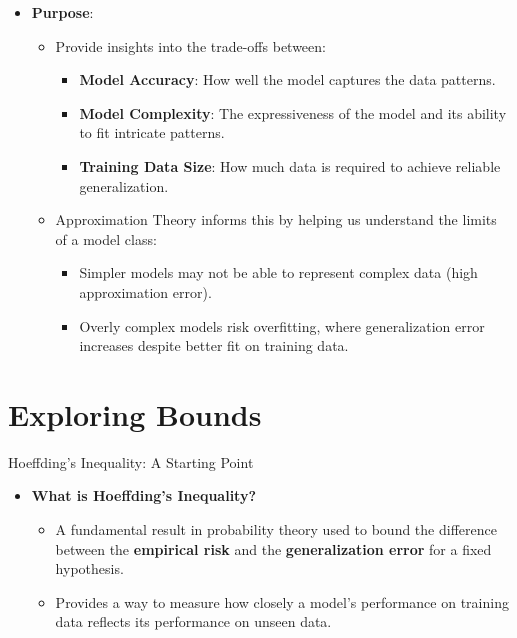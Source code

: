 \documentclass[
  ignorenonframetext,
]{beamer}
\providecommand{\tightlist}{%
  \setlength{\itemsep}{0pt}\setlength{\parskip}{0pt}}\usepackage{longtable,booktabs,array}
\begin{document}
\begin{frame}
\begin{itemize}
\tightlist
\item
  \textbf{Purpose}:

  \begin{itemize}
  \tightlist
  \item
    Provide insights into the trade-offs between:

    \begin{itemize}
    \tightlist
    \item
      \textbf{Model Accuracy}: How well the model captures the data
      patterns.
    \item
      \textbf{Model Complexity}: The expressiveness of the model and its
      ability to fit intricate patterns.
    \item
      \textbf{Training Data Size}: How much data is required to achieve
      reliable generalization.
    \end{itemize}
  \item
    Approximation Theory informs this by helping us understand the
    limits of a model class:

    \begin{itemize}
    \tightlist
    \item
      Simpler models may not be able to represent complex data (high
      approximation error).
    \item
      Overly complex models risk overfitting, where generalization error
      increases despite better fit on training data.
    \end{itemize}
  \end{itemize}
\end{itemize}
\end{frame}

\section{Exploring Bounds}\label{exploring-bounds}

\begin{frame}{Hoeffding's Inequality: A Starting Point}
\label{hoeffdings-inequality-a-starting-point}
\begin{itemize}
\tightlist
\item
  \textbf{What is Hoeffding's Inequality?}

  \begin{itemize}
  \tightlist
  \item
    A fundamental result in probability theory used to bound the
    difference between the \textbf{empirical risk} and the
    \textbf{generalization error} for a fixed hypothesis.
  \item
    Provides a way to measure how closely a model's performance on
    training data reflects its performance on unseen data.
  \end{itemize}
\end{itemize}
\end{frame}
\end{document}
